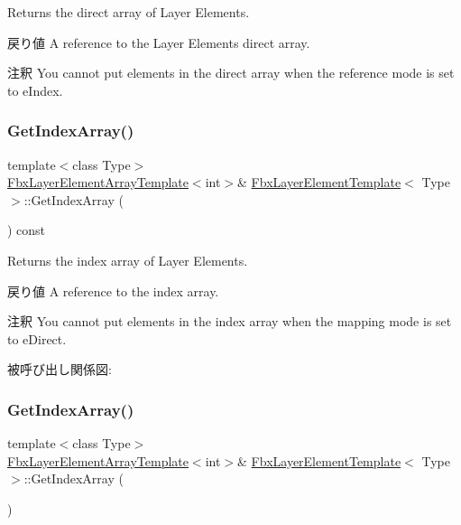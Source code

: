 Returns the direct array of Layer Elements. \begin{DoxyReturn}{戻り値}
A reference to the Layer Elements direct array. 
\end{DoxyReturn}
\begin{DoxyRemark}{注釈}
You cannot put elements in the direct array when the reference mode is set to e\+Index. 
\end{DoxyRemark}
\mbox{\label{class_fbx_layer_element_template_ab1494495d1944eb4b20c4c97abd6358c}} 
\subsubsection{\texorpdfstring{Get\+Index\+Array()}{GetIndexArray()}\hspace{0.1cm}{\footnotesize\ttfamily [1/2]}}
{\footnotesize\ttfamily template$<$class Type$>$ \\
\hyperlink{class_fbx_layer_element_array_template}{Fbx\+Layer\+Element\+Array\+Template}$<$int$>$\& \hyperlink{class_fbx_layer_element_template}{Fbx\+Layer\+Element\+Template}$<$ Type $>$\+::Get\+Index\+Array (\begin{DoxyParamCaption}{ }\end{DoxyParamCaption}) const}

Returns the index array of Layer Elements. \begin{DoxyReturn}{戻り値}
A reference to the index array. 
\end{DoxyReturn}
\begin{DoxyRemark}{注釈}
You cannot put elements in the index array when the mapping mode is set to e\+Direct. 
\end{DoxyRemark}
被呼び出し関係図\+:
\mbox{\label{class_fbx_layer_element_template_a299f160a392be9be520df2d0a1275fc8}} 
\subsubsection{\texorpdfstring{Get\+Index\+Array()}{GetIndexArray()}\hspace{0.1cm}{\footnotesize\ttfamily [2/2]}}
{\footnotesize\ttfamily template$<$class Type$>$ \\
\hyperlink{class_fbx_layer_element_array_template}{Fbx\+Layer\+Element\+Array\+Template}$<$int$>$\& \hyperlink{class_fbx_layer_element_template}{Fbx\+Layer\+Element\+Template}$<$ Type $>$\+::Get\+Index\+Array (\begin{DoxyParamCaption}{ }\end{DoxyParamCaption})}

